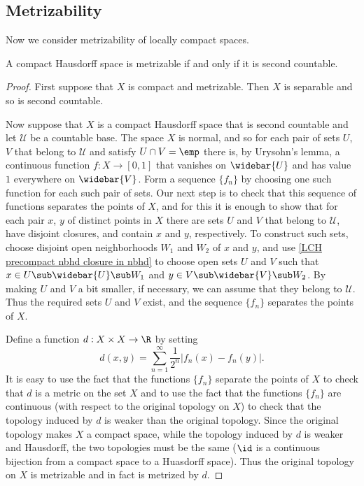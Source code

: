 \subsection{Metrizability}
Now we consider metrizability of locally compact spaces.
\begin{proposition}\label{compact Hausdorff metrizable iff C_2}
A compact Hausdorff space is metrizable if and only if it is second countable.
\end{proposition}
\begin{proof}
First suppose that $X$ is compact and metrizable. Then $X$ is separable and so is second countable.\par
Now suppose that $X$ is a compact Hausdorff space that is second countable and let $\mathcal{U}$ be a countable base. The space $X$ is normal, and so for each pair of sets $U$, $V$ that belong to $\mathcal{U}$ and satisfy $U\cap V=\emp$ there is, by Urysohn's lemma, a continuous function $f:X\to[0,1]$ that vanishes on $\widebar{U}$ and has value $1$ everywhere on $\widebar{V}$. Form a sequence $\{f_n\}$ by choosing one such function for each such pair of sets. Our next step is to check that this sequence of functions separates the points of $X$, and for this it is enough to show that for each pair $x$, $y$ of distinct points in $X$ there are sets $U$ and $V$ that belong to $\mathcal{U}$, have disjoint closures, and contain $x$ and $y$, respectively. To construct such sets, choose disjoint open neighborhoods $W_1$ and $W_2$ of $x$ and $y$, and use \cref{LCH precompact nbhd closure in nbhd} to choose open sets $U$ and $V$ such that $x\in U\sub\widebar{U}\sub W_1$ and $y\in V\sub\widebar{V}\sub W_2$. By making $U$ and $V$ a bit smaller, if necessary, we can assume that they belong to $\mathcal{U}$. Thus the required sets $U$ and $V$ exist, and the sequence $\{f_n\}$ separates the points of $X$.\par
Define a function $d:X\times X\to\R$ by setting
\[d(x,y)=\sum_{n=1}^{\infty}\frac{1}{2^n}|f_n(x)-f_n(y)|.\]
It is easy to use the fact that the functions $\{f_n\}$ separate the points of $X$ to check that $d$ is a metric on the set $X$ and to use the fact that the functions $\{f_n\}$ are continuous (with respect to the original topology on $X$) to check that the topology induced by $d$ is weaker than the original topology. Since the original topology makes $X$ a compact space, while the topology induced by $d$ is weaker and Hausdorff, the two topologies must be the same ($\id$ is a continuous bijection from a compact space to a Huasdorff space). Thus the original topology on $X$ is metrizable and in fact is metrized by $d$.
\end{proof}

